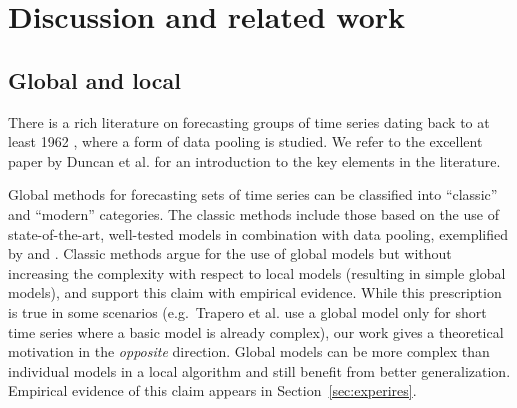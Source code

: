 \documentclass[a4paper]{article}
\theoremstyle{custom}
\begin{document}
\section{Discussion and related work}
\label{sec:related}

\subsection{Global and local}
\label{sec:relglobloc}

There is a rich literature on forecasting groups of time series dating back to at least 1962 \cite{zellner1962efficient}, where a form of data pooling is studied. We refer to the excellent paper by Duncan et al. \cite{duncan2001forecasting} for an introduction to the key elements in the literature.

Global methods for forecasting sets of time series can be classified into ``classic'' and ``modern'' categories.
The classic methods include those based on the use of state-of-the-art, well-tested models in combination with data pooling, exemplified by \cite{duncan2001forecasting} and \cite{trapero2015identification}.
Classic methods argue for the use of global models but without increasing the complexity with respect to local models (resulting in simple global models), and support this claim with empirical evidence.
While this prescription is true in some scenarios (e.g.\ Trapero et al. \cite{trapero2015identification} use a global model only for short time series where a basic model is already complex), our work gives a theoretical motivation in the \textit{opposite} direction. Global models can be more complex than individual models in a local algorithm and still benefit from better generalization.
Empirical evidence of this claim appears in Section~\ref{sec:experires}.
\end{document}
